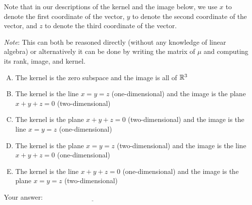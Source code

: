 \documentclass[10pt]{amsart}
\begin{document}
\begin{enumerate}
  Note that in our descriptions of the kernel and the image below, we
  use $x$ to denote the first coordinate of the vector, $y$ to denote
  the second coordinate of the vector, and $z$ to denote the third
  coordinate of the vector.

  {\em Note}: This can both be reasoned directly (without any
  knowledge of linear algebra) or alternatively it can be done by
  writing the matrix of $\mu$ and computing its rank, image, and
  kernel.

  \begin{enumerate}[(A)]
  \item The kernel is the zero subspace and the image is all of $\mathbb{R}^3$
  \item The kernel is the line $x = y = z$ (one-dimensional) and the
    image is the plane $x + y + z = 0$ (two-dimensional)
  \item The kernel is the plane $x + y + z = 0$ (two-dimensional) and
    the image is the line $x = y = z$ (one-dimensional)
  \item The kernel is the plane $x = y = z$ (two-dimensional) and the
    image is the line $x + y + z = 0$ (one-dimensional)
  \item The kernel is the line $x + y + z = 0$ (one-dimensional) and
    the image is the plane $x = y = z$ (two-dimensional)
  \end{enumerate}

  \vspace{0.1in}
  Your answer: $\underline{\qquad\qquad\qquad\qquad\qquad\qquad\qquad}$
  \vspace{0.1in}
\end{enumerate}
\end{document}
